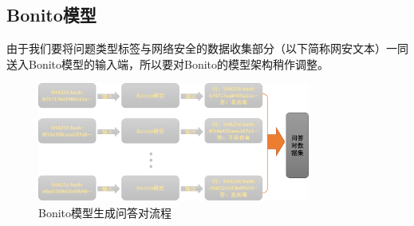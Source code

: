 \subsection{Bonito模型}
由于我们要将问题类型标签与网络安全的数据收集部分（以下简称网安文本）一同送入Bonito模型的输入端，所以要对Bonito的模型架构稍作调整。
\begin{figure}[htbp]
    \centering
    \includegraphics[width=0.8\textwidth]{./img/prompt.png}
    \caption{Bonito模型生成问答对流程}\label{fig:bonito}
\end{figure}

